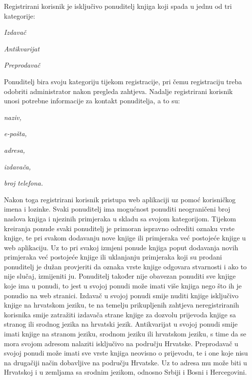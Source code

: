         Registrirani korisnik je isključivo ponuditelj knjiga koji spada u jednu od tri kategorije:
        \begin{packed_item}
			\item \textit{Izdavač}
			\item \textit{Antikvarijat}
			\item \textit{Preprodavač}
		\end{packed_item}
        Ponuditelj bira svoju kategoriju tijekom registracije, pri čemu registraciju treba odobriti administrator nakon pregleda zahtjeva. Nadalje registrirani korisnik unosi potrebne informacije za kontakt ponuditelja, a to su: 
        \begin{packed_item}
			\item \textit{naziv,}
			\item \textit{e-pošta,}
			\item \textit{adresa,}
			\item \textit{izdavača,}
			\item \textit{broj telefona.}
		\end{packed_item}
        Nakon toga registrirani korisnik pristupa web aplikaciji uz pomoć korisničkog imena i lozinke. Svaki ponuditelj ima mogućnost ponuditi neograničeni broj naslova knjiga i njezinih primjeraka u skladu sa svojom kategorijom. Tijekom kreiranja ponude svaki ponuditelj je primoran ispravno odrediti oznaku vrste knjige, te pri svakom dodavanju nove knjige ili primjeraka već postojeće knjige u web aplikaciju. Uz to pri svakoj izmjeni ponude knjiga poput dodavanja novih primjeraka već postojeće knjige ili uklanjanju primjeraka koji su prodani ponuditelj je dužan provjeriti da oznaka vrste knjige odgovara stvarnosti i ako to nije slučaj, izmijeniti ju. Ponuditelj također nije obavezan ponuditi sve knjige koje ima u ponudi, to jest u svojoj ponudi može imati više knjiga nego što ih je ponudio na web stranici.
        Izdavač u svojoj ponudi smije nuditi knjige isključivo knjige na hrvatskom jeziku, te na temelju prikupljenih zahtjeva neregistriranih korisnika smije zatražiti izdavača strane knjige za dozvolu prijevoda knjige sa stranog ili srodnog jezika na hrvatski jezik. 
        Antikvarijat u svojoj ponudi smije imati knjige na stranom jeziku, srodnom jeziku ili hrvatskom jeziku, s time da se mora svojom adresom nalaziti isključivo na području Hrvatske.
        Preprodavač u svojoj ponudi može imati sve vrste knjiga neovisno o prijevodu, te i one koje nisu na drugačiji način dobavljive na području Hrvatske. Uz to adresa mu može biti u Hrvatskoj i u zemljama sa srodnim jezikom, odnosno Srbiji i Bosni i Hercegovini.
       

